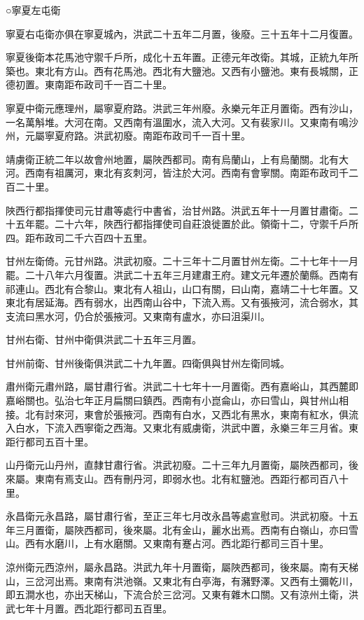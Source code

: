 ○寧夏左屯衛

寧夏右屯衛亦俱在寧夏城內，洪武二十五年二月置，後廢。三十五年十二月復置。

寧夏後衛本花馬池守禦千戶所，成化十五年置。正德元年改衛。其城，正統九年所築也。東北有方山。西有花馬池。西北有大鹽池。又西有小鹽池。東有長城關，正德初置。東南距布政司千一百二十里。

寧夏中衛元應理州，屬寧夏府路。洪武三年州廢。永樂元年正月置衛。西有沙山，一名萬斛堆。大河在南。又西南有溫圍水，流入大河。又有裴家川。又東南有鳴沙州，元屬寧夏府路。洪武初廢。南距布政司千一百十里。

靖虜衛正統二年以故會州地置，屬陜西都司。南有烏蘭山，上有烏蘭關。北有大河。西南有祖厲河，東北有亥刺河，皆注於大河。西南有會寧關。南距布政司千二百二十里。

陜西行都指揮使司元甘肅等處行中書省，治甘州路。洪武五年十一月置甘肅衛。二十五年罷。二十六年，陜西行都指揮使司自莊浪徙置於此。領衛十二，守禦千戶所四。距布政司二千六百四十五里。

甘州左衛倚。元甘州路。洪武初廢。二十三年十二月置甘州左衛。二十七年十一月罷。二十八年六月復置。洪武二十五年三月建肅王府。建文元年遷於蘭縣。西南有祁連山。西北有合黎山。東北有人祖山，山口有關，曰山南，嘉靖二十七年置。又東北有居延海。西有弱水，出西南山谷中，下流入焉。又有張掖河，流合弱水，其支流曰黑水河，仍合於張掖河。又東南有盧水，亦曰沮渠川。

甘州右衛、甘州中衛俱洪武二十五年三月置。

甘州前衛、甘州後衛俱洪武二十九年置。四衛俱與甘州左衛同城。

肅州衛元肅州路，屬甘肅行省。洪武二十七年十一月置衛。西有嘉峪山，其西麓即嘉峪關也。弘治七年正月扁關曰鎮西。西南有小崑侖山，亦曰雪山，與甘州山相接。北有討來河，東會於張掖河。西南有白水，又西北有黑水，東南有紅水，俱流入白水，下流入西寧衛之西海。又東北有威虜衛，洪武中置，永樂三年三月省。東距行都司五百十里。

山丹衛元山丹州，直隸甘肅行省。洪武初廢。二十三年九月置衛，屬陜西都司，後來屬。東南有焉支山。西有刪丹河，即弱水也。北有紅鹽池。西距行都司百八十里。

永昌衛元永昌路，屬甘肅行省，至正三年七月改永昌等處宣慰司。洪武初廢。十五年三月置衛，屬陜西都司，後來屬。北有金山，麗水出焉。西南有白嶺山，亦曰雪山。西有水磨川，上有水磨關。又東南有蹇占河。西北距行都司三百十里。

涼州衛元西涼州，屬永昌路。洪武九年十月置衛，屬陜西都司，後來屬。南有天梯山，三岔河出焉。東南有洪池嶺。又東北有白亭海，有瀦野澤。又西有土彌乾川，即五澗水也，亦出天梯山，下流合於三岔河。又東有雜木口關。又有涼州土衛，洪武七年十月置。西北距行都司五百里。

